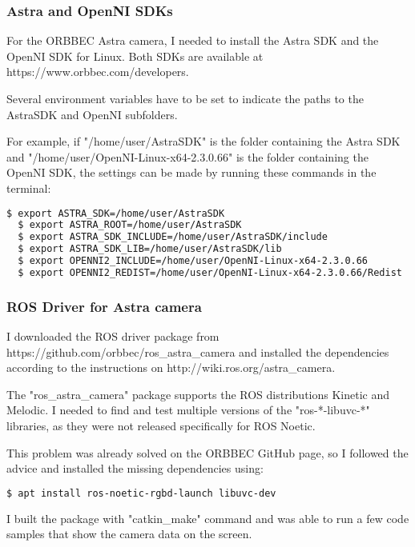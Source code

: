 \subsubsection{Astra and OpenNI SDKs}
For the ORBBEC Astra camera, I needed to install the Astra SDK and the OpenNI SDK for Linux. Both SDKs are available at https://www.orbbec.com/developers.\par
Several environment variables have to be set to indicate the paths to the AstraSDK and OpenNI subfolders.\par
For example, if "/home/user/AstraSDK" is the folder containing the Astra SDK and "/home/user/OpenNI-Linux-x64-2.3.0.66" is the folder containing the OpenNI SDK, the settings can be made by running these commands in the terminal: \par

\begin{lstlisting}[language=bash]
  $ export ASTRA_SDK=/home/user/AstraSDK
  $ export ASTRA_ROOT=/home/user/AstraSDK
  $ export ASTRA_SDK_INCLUDE=/home/user/AstraSDK/include
  $ export ASTRA_SDK_LIB=/home/user/AstraSDK/lib
  $ export OPENNI2_INCLUDE=/home/user/OpenNI-Linux-x64-2.3.0.66
  $ export OPENNI2_REDIST=/home/user/OpenNI-Linux-x64-2.3.0.66/Redist
\end{lstlisting}

\subsubsection{ROS Driver for Astra camera}
I downloaded the ROS driver package from https://github.com/orbbec/ros\_astra\_camera and installed the dependencies according to the instructions on http://wiki.ros.org/astra\_camera.\par
The "ros\_astra\_camera" package supports the ROS distributions Kinetic and Melodic. I needed to find and test multiple versions of the "ros-*-libuvc-*" libraries, as they were not released specifically for ROS Noetic.\par
This problem was already solved on the ORBBEC GitHub page, so I followed the advice and installed the missing dependencies using:\par

\begin{lstlisting}[language=bash]
  $ apt install ros-noetic-rgbd-launch libuvc-dev
\end{lstlisting}


I built the package with "catkin\_make" command and was able to run a few code samples that show the camera data on the screen.\par


